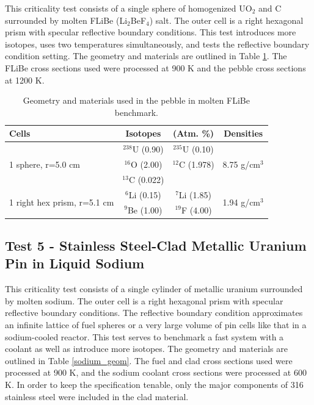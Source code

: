 \documentclass[preprint,12pt]{elsarticle}
\begin{document}
This criticality test consists of a single sphere of homogenized UO$_2$ and C surrounded by molten FLiBe (Li$_2$BeF$_4$) salt.  The outer cell is a right hexagonal prism with specular reflective boundary conditions.  This test introduces more isotopes, uses two temperatures simultaneously, and tests the reflective boundary condition setting.  The geometry and materials are outlined in Table \ref{pebble_geom}.  The FLiBe cross sections used were processed at 900 K and the pebble cross sections at 1200 K.

\begin{table}[h]
\centering
\caption{Geometry and materials used in the pebble in molten FLiBe benchmark.}
\label{pebble_geom}
\begin{tabular}{| l | c  c | c |}
\hline
Cells & Isotopes & (Atm.  \%)& Densities \\
\hline
\multirow{3}{*}{1 sphere, r=5.0 cm }  &   $^{238}$U   (0.90) &  $^{235}$U   (0.10) &  \multirow{3}{*}{8.75 g/cm$^3$} \\
                                      &   $^{16}$O    (2.00) &  $^{12}$C    (1.978) &  \\
                                      &   $^{13}$C    (0.022)&                     &  \\
\hline
\multirow{2}{*}{1 right hex prism, r=5.1 cm }  &   $^{6}$Li  (0.15) &  $^{7}$Li  (1.85)&  \multirow{2}{*}{1.94 g/cm$^3$} \\
                                               &  $^{9}$Be  (1.00) & $^{19}$F  (4.00) &  \\
\hline
\end{tabular}
\end{table}

\subsection{Test 5 - Stainless Steel-Clad Metallic Uranium Pin in Liquid Sodium}

This criticality test consists of a single cylinder of metallic uranium surrounded by molten sodium.  The outer cell is a right hexagonal prism with specular reflective boundary conditions.  The reflective boundary condition approximates an infinite lattice of fuel spheres or a very large volume of pin cells like that in a sodium-cooled reactor.  This test serves to benchmark a fast system with a coolant as well as introduce more isotopes.  The geometry and materials are outlined in Table \ref{sodium_geom}.  The fuel and clad cross sections used were processed at 900 K, and the sodium coolant cross sections were processed at 600 K.  In order to keep the specification tenable, only the major components of 316 stainless steel were included in the clad material. 
\end{document}
